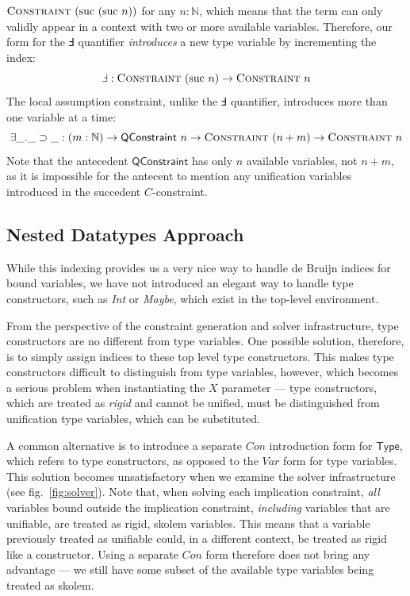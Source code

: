 \documentclass[a4paper]{jfp}
\begin{document}
$\textsc{Constraint}\ (\text{suc}\ (\text{suc}\ n))$ for any $n : \mathbb{N}$, which means that the term can only validly appear in a context with
two or more available variables. Therefore, our form for the $\Finv$ quantifier \emph{introduces} a new type variable by incrementing the index:
\begin{displaymath}
   \Finv : \textsc{Constraint}\ (\text{suc}\ n) \rightarrow \textsc{Constraint}\ n \\
\end{displaymath}
The local assumption constraint, unlike the $\Finv$ quantifier, introduces more than one variable at a time:
\begin{displaymath}
   \exists\_.\_\supset\_ : (m : \mathbb{N}) \rightarrow \textsf{QConstraint}\ n \rightarrow \textsc{Constraint}\ (n + m) \rightarrow
   \textsc{Constraint}\ n
\end{displaymath}
Note that the antecedent $\textsf{QConstraint}$ has only $n$ available variables, not $n + m$, as it is impossible for the antecent to mention any
unification variables introduced in the succedent $C$-constraint. 

\subsection{Nested Datatypes Approach}

While this indexing provides us a very nice way to handle de Bruijn indices for bound variables, we have not introduced an elegant way to handle type
constructors, such as \emph{Int} or \emph{Maybe}, which exist in the top-level environment. 

From the perspective of the constraint generation and solver infrastructure, type constructors are no different from type variables. One possible
solution, therefore, is to simply assign indices to these top level type constructors. This makes type constructors difficult to distinguish
from type variables, however, which becomes a serious problem when instantiating the $X$ parameter --- type constructors, which are treated as
\emph{rigid} and cannot be unified, must be distinguished from unification type variables, which can be substituted.

A common alternative is to introduce a separate $\mathit{Con}$ introduction form for $\textsf{Type}$, which refers to type constructors, as opposed to
the $\mathit{Var}$ form for type variables. This solution becomes unsatisfactory when we examine the solver infrastructure (see
fig.~\ref{fig:solver}). Note that, when solving each implication constraint, \emph{all} variables bound outside the implication constraint,
\emph{including} variables that are unifiable, are treated as rigid, skolem variables. This means that a variable previously treated as unifiable
could, in a different context, be treated as rigid like a constructor. Using a separate $\mathit{Con}$ form therefore does not bring any advantage ---
we still have some subset of the available type variables being treated as skolem. 
\end{document}
